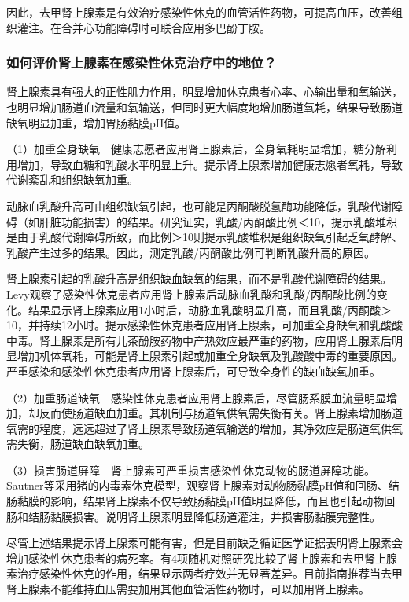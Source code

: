因此，去甲肾上腺素是有效治疗感染性休克的血管活性药物，可提高血压，改善组织灌注。在合并心功能障碍时可联合应用多巴酚丁胺。

\subsubsection{如何评价肾上腺素在感染性休克治疗中的地位？}

肾上腺素具有强大的正性肌力作用，明显增加休克患者心率、心输出量和氧输送，也明显增加肠道血流量和氧输送，但同时更大幅度地增加肠道氧耗，结果导致肠道缺氧明显加重，增加胃肠黏膜pH值。

（1）加重全身缺氧　健康志愿者应用肾上腺素后，全身氧耗明显增加，糖分解利用增加，导致血糖和乳酸水平明显上升。提示肾上腺素增加健康志愿者氧耗，导致代谢紊乱和组织缺氧加重。

动脉血乳酸升高可由组织缺氧引起，也可能是丙酮酸脱氢酶功能降低，乳酸代谢障碍（如肝脏功能损害）的结果。研究证实，乳酸/丙酮酸比例＜10，提示乳酸堆积是由于乳酸代谢障碍所致，而比例＞10则提示乳酸堆积是组织缺氧引起乏氧酵解、乳酸产生过多的结果。因此，测定乳酸/丙酮酸比例可判断乳酸升高的原因。

肾上腺素引起的乳酸升高是组织缺血缺氧的结果，而不是乳酸代谢障碍的结果。Levy观察了感染性休克患者应用肾上腺素后动脉血乳酸和乳酸/丙酮酸比例的变化。结果显示肾上腺素应用1小时后，动脉血乳酸明显升高，而且乳酸/丙酮酸＞10，并持续12小时。提示感染性休克患者应用肾上腺素，可加重全身缺氧和乳酸酸中毒。肾上腺素是所有儿茶酚胺药物中产热效应最严重的药物，应用肾上腺素后明显增加机体氧耗，可能是肾上腺素引起或加重全身缺氧及乳酸酸中毒的重要原因。严重感染和感染性休克患者应用肾上腺素后，可导致全身性的缺血缺氧加重。

（2）加重肠道缺氧　感染性休克患者应用肾上腺素后，尽管肠系膜血流量明显增加，却反而使肠道缺血加重。其机制与肠道氧供氧需失衡有关。肾上腺素增加肠道氧需的程度，远远超过了肾上腺素导致肠道氧输送的增加，其净效应是肠道氧供氧需失衡，肠道缺血缺氧加重。

（3）损害肠道屏障　肾上腺素可严重损害感染性休克动物的肠道屏障功能。Sautner等采用猪的内毒素休克模型，观察肾上腺素对动物肠黏膜pH值和回肠、结肠黏膜的影响，结果肾上腺素不仅导致肠黏膜pH值明显降低，而且也引起动物回肠和结肠黏膜损害。说明肾上腺素明显降低肠道灌注，并损害肠黏膜完整性。

尽管上述结果提示肾上腺素可能有害，但是目前缺乏循证医学证据表明肾上腺素会增加感染性休克患者的病死率。有4项随机对照研究比较了肾上腺素和去甲肾上腺素治疗感染性休克的作用，结果显示两者疗效并无显著差异。目前指南推荐当去甲肾上腺素不能维持血压需要加用其他血管活性药物时，可以加用肾上腺素。


